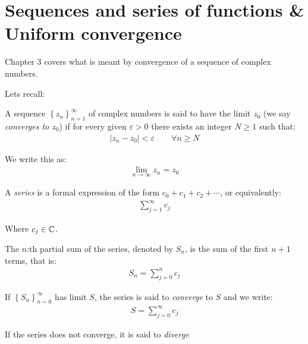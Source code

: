 \section{Sequences and series of functions \& Uniform convergence}\par
\noindent Chapter 3 covers what is meant by convergence of a sequence of complex numbers.\par
\noindent Lets recall:
\par\bigskip
\setcounter{section}{3}
\setcounter{theo}{10}
\begin{theo}{}
  A sequence $\left\{z_n\right\}_{n=1}^\infty$ of complex numbers is said to have the limit $z_0$ (we say \textit{converges to $z_0$}) if for every given $\varepsilon>0$ there exists an integer $N\geq1$ such that:
  \begin{equation*}
    \begin{gathered}
      \left|z_n-z_0\right|<\varepsilon\qquad\forall n\geq N
    \end{gathered}
  \end{equation*}
  \par\bigskip
  \noindent We write this as:
  \begin{equation*}
    \begin{gathered}
      \lim_{n\to\infty}z_n = z_0
    \end{gathered}
  \end{equation*}
\end{theo}
\setcounter{section}{16}
\setcounter{theo}{0}
\par\bigskip
\begin{theo}{}
  A \textit{series} is a formal expression of the form $c_0+c_1+c_2+\cdots$, or equivalently:
  \begin{equation*}
    \begin{gathered}
      \sum_{j=1}^{\infty}c_j
    \end{gathered}
  \end{equation*}\par
  \noindent Where $c_j\in\mathbb{C}$. 
  \par\bigskip
  \noindent The $n$:th partial sum of the series, denoted by $S_n$, is the sum of the first $n+1$ terms, that is:
  \begin{equation*}
    \begin{gathered}
      S_n = \sum_{j=0}^{n}c_j
    \end{gathered}
  \end{equation*}
  \par\bigskip
  \noindent If $\left\{S_n\right\}_{n=0}^\infty$ has limit $S$, the series is said to \textit{converge} to $S$ and we write:
  \begin{equation*}
    \begin{gathered}
      S = \sum_{j=0}^{\infty}c_j
    \end{gathered}
  \end{equation*}
  \par\bigskip
  \noindent If the series does not converge, it is said to \textit{diverge} 
\end{theo}
